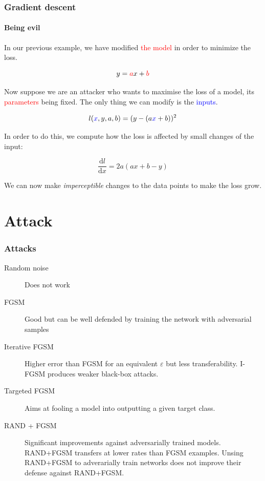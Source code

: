 \documentclass[9pt]{beamer}
\begin{document}
\begin{frame}
  \frametitle{Gradient descent}

  \framesubtitle{Being evil}

  \vspace{-0.5cm}

  \begin{center}
    \scalebox{0.5}{
      
    }
  \end{center}

  In our previous example, we have modified \textcolor{red}{the model}
  in order to minimize the loss.

  \[
  y = \textcolor{red}{a}x + \textcolor{red}{b}
  \]

  \pause

  Now suppose we are an attacker who wants to maximise the loss of a
  model, its \textcolor{red}{parameters} being fixed. The only thing
  we can modify is the \textcolor{blue}{inputs}.

  \[
  l(\textcolor{blue}{x}, y, a, b) = (y - (a \textcolor{blue}{x} + b))^{2}
  \]

  \pause

  In order to do this, we compute how the loss is affected by small
  changes of the input:

  \[
  \frac{\mathrm{d}l}{\mathrm{d}x} = 2 a (ax + b - y)
  \]

  We can now make \emph{imperceptible} changes to the data points to make
  the loss grow.
\end{frame}

\section{Attack}

\begin{frame}
  \frametitle{Attacks}

  \begin{description}
  \item[Random noise] Does not work
  \item[FGSM] Good but can be well defended by training the network
    with adversarial samples
  \item[Iterative FGSM] Higher error than FGSM for an equivalent
    $\varepsilon$ but less transferability. I-FGSM produces weaker
    black-box attacks.
  \item[Targeted FGSM] Aims at fooling a model into outputting a given
    target class.
  \item[RAND + FGSM] Significant improvements against adversarially
    trained models. RAND+FGSM transfers at lower rates than FGSM
    examples. Unsing RAND+FGSM to adverarially train networks does not
    improve their defense against RAND+FGSM.
  \end{description}
\end{frame}
\end{document}
